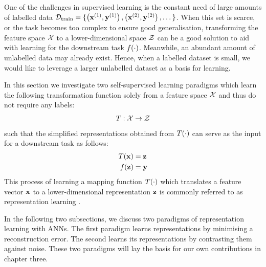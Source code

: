 
One of the challenges in supervised learning is the constant need of large amounts of labelled data $\mathcal{D}_{\text{train}} = \{ \left( \mathbf{x}^{(1)}, \mathbf{y}^{(1)} \right), \left( \mathbf{x}^{(2)}, \mathbf{y}^{(2)} \right), \dots \}$. When this set is scarce, or the task becomes too complex to ensure good generalisation, transforming the feature space $\mathcal{X}$ to a lower-dimensional space $\mathcal{Z}$ can be a good solution to aid with learning for the downstream task $f(\cdot)$. Meanwhile, an abundant amount of unlabelled data may already exist. Hence, when a labelled dataset is small, we would like to leverage a larger unlabelled dataset as a basis for learning.

In this section we investigate two self-supervised learning paradigms which learn the following transformation function solely from a feature space $\mathcal{X}$ and thus do not require any labels:
$$T: \mathcal{X} \rightarrow \mathcal{Z}$$
such that the simplified representations obtained from $T(\cdot)$ can serve as the input for a downstream task as follows:
\begin{align*}
	T(\mathbf{x}) &=  \mathbf{z} \\
	f(\mathbf{z}) &= \mathbf{y} 
\end{align*}
This process of learning a mapping function $T(\cdot)$ which translates a feature vector $\mathbf{x}$ to a lower-dimensional representation $\mathbf{z}$ is commonly referred to as representation learning \citep{le-khacContrastiveRepresentationLearning2020}. 

In the following two subsections, we discuss two paradigms of representation learning with ANNs. The first paradigm learns representations by minimising a reconstruction error. The second learns its representations by contrasting them against noise. These two paradigms will lay the basis for our own contributions in chapter three.

